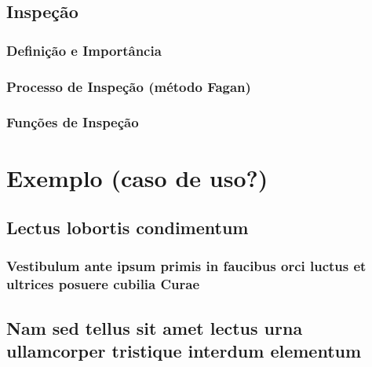 \documentclass[
	12pt,				%
	openright,			%
	twoside,			%
	a4paper,			%
	english,			%
	brazil,				%
	]{abntex2}
\begin{document}
\chapter{Inspeção}

\section{Definição e Importância}

\section{Processo de Inspeção (método Fagan)}

\section{Funções de Inspeção}


\part{Exemplo (caso de uso?)}

\chapter{Lectus lobortis condimentum}

\section{Vestibulum ante ipsum primis in faucibus orci luctus et ultrices
posuere cubilia Curae}

\lipsum[21-22]

\chapter{Nam sed tellus sit amet lectus urna ullamcorper tristique interdum
elementum}
\end{document}
